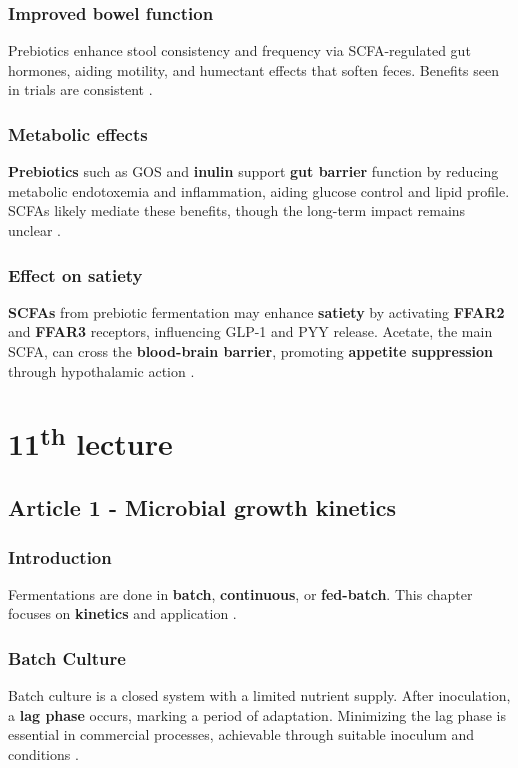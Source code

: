 \subsubsection*{Improved bowel function}
Prebiotics enhance stool consistency and frequency via SCFA-regulated gut hormones, aiding motility, and humectant effects that soften feces. Benefits seen in trials are consistent \cite*{L10-Pro_Pre}.

\subsubsection*{Metabolic effects}
\textbf{Prebiotics} such as GOS and \textbf{inulin} support \textbf{gut barrier} function by reducing metabolic endotoxemia and inflammation, aiding glucose control and lipid profile. SCFAs likely mediate these benefits, though the long-term impact remains unclear \cite*{L10-Pro_Pre}.

\subsubsection*{Effect on satiety}
\textbf{SCFAs} from prebiotic fermentation may enhance \textbf{satiety} by activating \textbf{FFAR2} and \textbf{FFAR3} receptors, influencing GLP-1 and PYY release. Acetate, the main SCFA, can cross the \textbf{blood-brain barrier}, promoting \textbf{appetite suppression} through hypothalamic action \cite*{L10-Pro_Pre}.

\section{11\texorpdfstring{\textsuperscript{th}}{th} lecture}
\subsection{Article 1 -  Microbial growth kinetics}
\subsubsection*{Introduction}
Fermentations are done in \textbf{batch}, \textbf{continuous}, or \textbf{fed-batch}. This chapter focuses on \textbf{kinetics} and application \cite*{L11-MicroGrow}.

\subsubsection{Batch Culture}
Batch culture is a closed system with a limited nutrient supply. After inoculation, a \textbf{lag phase} occurs, marking a period of adaptation. Minimizing the lag phase is essential in commercial processes, achievable through suitable inoculum and conditions \cite*{L11-MicroGrow}.

